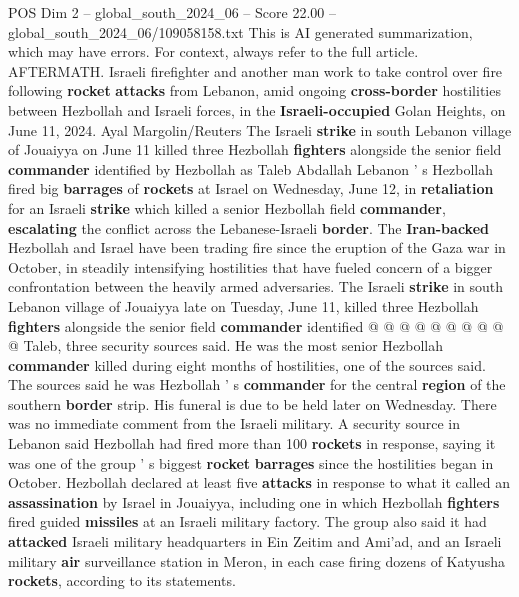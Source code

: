 \begin{textsample}{POS Dim 2 – global\_south\_2024\_06 – Score 22.00 – global\_south\_2024\_06/109058158.txt}  \label{ex:f2_pos_117}
This is AI generated summarization, which may have errors.
For context, always refer to the full article.
AFTERMATH.
Israeli firefighter and another man work to take control over fire following \textbf{rocket} \textbf{attacks} from Lebanon, amid ongoing \textbf{cross-border} hostilities between Hezbollah and Israeli forces, in the \textbf{Israeli-occupied} Golan Heights, on June 11, 2024.
Ayal Margolin/Reuters The Israeli \textbf{strike} in south Lebanon village of Jouaiyya on June 11 killed three Hezbollah \textbf{fighters} alongside the senior field \textbf{commander} identified by Hezbollah as Taleb Abdallah Lebanon ' s Hezbollah fired big \textbf{barrages} of \textbf{rockets} at Israel on Wednesday, June 12, in \textbf{retaliation} for an Israeli \textbf{strike} which killed a senior Hezbollah field \textbf{commander}, \textbf{escalating} the conflict across the Lebanese-Israeli \textbf{border}.
The \textbf{Iran-backed} Hezbollah and Israel have been trading fire since the eruption of the Gaza war in October, in steadily intensifying hostilities that have fueled concern of a bigger confrontation between the heavily armed adversaries.
The Israeli \textbf{strike} in south Lebanon village of Jouaiyya late on Tuesday, June 11, killed three Hezbollah \textbf{fighters} alongside the senior field \textbf{commander} identified @ @ @ @ @ @ @ @ @ @ Taleb, three security sources said.
He was the most senior Hezbollah \textbf{commander} killed during eight months of hostilities, one of the sources said.
The sources said he was Hezbollah ' s \textbf{commander} for the central \textbf{region} of the southern \textbf{border} strip.
His funeral is due to be held later on Wednesday.
There was no immediate comment from the Israeli military.
A security source in Lebanon said Hezbollah had fired more than 100 \textbf{rockets} in response, saying it was one of the group ' s biggest \textbf{rocket} \textbf{barrages} since the hostilities began in October.
Hezbollah declared at least five \textbf{attacks} in response to what it called an \textbf{assassination} by Israel in Jouaiyya, including one in which Hezbollah \textbf{fighters} fired guided \textbf{missiles} at an Israeli military factory.
The group also said it had \textbf{attacked} Israeli military headquarters in Ein Zeitim and Ami'ad, and an Israeli military \textbf{air} surveillance station in Meron, in each case firing dozens of Katyusha \textbf{rockets}, according to its statements.

\end{textsample}
